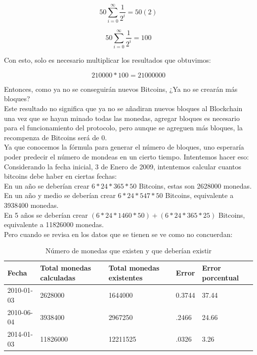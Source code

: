 \documentclass[12pt,letterpaper]{article}
\begin{document}
    $$ 50 \sum_{i = 0}^{\infty} \frac{1}{2^{i}} = 50 (2) $$

    $$ 50 \sum_{i = 0}^{\infty} \frac{1}{2^{i}} = 100 $$

    Con esto, solo es necesario multiplicar los resultados que obtuvimos:

    $$ 210000 * 100 = 21000000 $$

    Entonces, como ya no se conseguir\'an nuevos Bitcoins, ¿Ya no se crear\'an m\'as bloques?
    \\
    Este resultado no significa que ya no se a\~nadiran nuevos bloques al Blockchain una vez que se hayan minado todas las monedas, agregar bloques es necesario para el funcionamiento del protocolo, pero aunque se agreguen m\'as bloques, la recompenza de Bitcoins ser\'a de 0.
    \\

    Ya que conocemos la f\'ormula para generar el n\'umero de bloques, uno esperar\'ia poder predecir el n\'umero de mondeas en un cierto tiempo. Intentemos hacer eso:
    \\
    Considerando la fecha inicial, 3 de Enero de 2009, intentemos calcular cuantos bitcoins debe haber en ciertas fechas:
    \\
    En un a\~no se deber\'ian crear $6 * 24 * 365 * 50$ Bitcoins, estas son 2628000 monedas.
    \\
    En un a\~no y medio se deber\'ian crear $6 * 24 * 547 * 50$ Bitcoins, equivalente a 3938400 monedas.
    \\
    En 5 a\~nos se deber\'ian crear $(6 * 24 * 1460 * 50) + (6 * 24 * 365 * 25)$ Bitcoins, equivalente a 11826000 monedas.
    \\
    Pero cuando se revisa en los datos que se tienen se ve como no concuerdan:

    \begin{table}[h]
    \centering
    \caption{N\'umero de monedas que existen y que deber\'ian existir}
    \label{label7}
    \begin{tabular}{|l|l|l|l|l|}
    \hline
    \rowcolor[HTML]{FFFFFF}
    {\color[HTML]{333333} Fecha} & {\color[HTML]{333333} Total monedas  calculadas} & {\color[HTML]{333333} Total monedas existentes} & {\color[HTML]{333333} Error} & {\color[HTML]{333333} Error porcentual} \\ \hline
    2010-01-03                   & 2628000                                          & 1644000                                         & 0.3744                       & 37.44                                   \\ \hline
    2010-06-04                   & 3938400                                          & 2967250                                         & .2466                        & 24.66                                   \\ \hline
    2014-01-03                   & 11826000                                         & 12211525                                        & .0326                        & 3.26                                    \\ \hline
    \end{tabular}
    \end{table}
\end{document}
